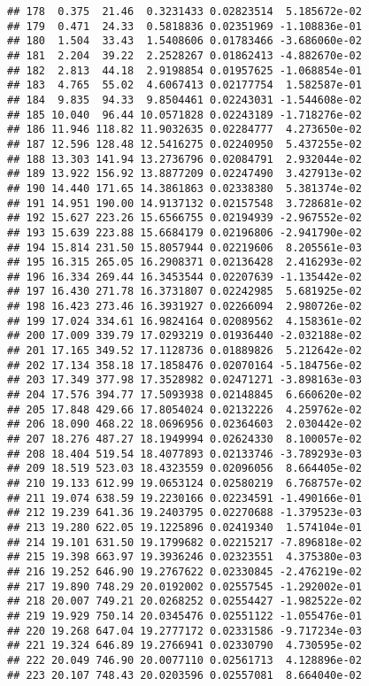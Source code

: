 \documentclass[]{book}
\theoremstyle{definition}
\theoremstyle{definition}
\theoremstyle{definition}
\theoremstyle{remark}
\begin{document}
\begin{verbatim}
## 178  0.375  21.46  0.3231433 0.02823514  5.185672e-02
## 179  0.471  24.33  0.5818836 0.02351969 -1.108836e-01
## 180  1.504  33.43  1.5408606 0.01783466 -3.686060e-02
## 181  2.204  39.22  2.2528267 0.01862413 -4.882670e-02
## 182  2.813  44.18  2.9198854 0.01957625 -1.068854e-01
## 183  4.765  55.02  4.6067413 0.02177754  1.582587e-01
## 184  9.835  94.33  9.8504461 0.02243031 -1.544608e-02
## 185 10.040  96.44 10.0571828 0.02243189 -1.718276e-02
## 186 11.946 118.82 11.9032635 0.02284777  4.273650e-02
## 187 12.596 128.48 12.5416275 0.02240950  5.437255e-02
## 188 13.303 141.94 13.2736796 0.02084791  2.932044e-02
## 189 13.922 156.92 13.8877209 0.02247490  3.427913e-02
## 190 14.440 171.65 14.3861863 0.02338380  5.381374e-02
## 191 14.951 190.00 14.9137132 0.02157548  3.728681e-02
## 192 15.627 223.26 15.6566755 0.02194939 -2.967552e-02
## 193 15.639 223.88 15.6684179 0.02196806 -2.941790e-02
## 194 15.814 231.50 15.8057944 0.02219606  8.205561e-03
## 195 16.315 265.05 16.2908371 0.02136428  2.416293e-02
## 196 16.334 269.44 16.3453544 0.02207639 -1.135442e-02
## 197 16.430 271.78 16.3731807 0.02242985  5.681925e-02
## 198 16.423 273.46 16.3931927 0.02266094  2.980726e-02
## 199 17.024 334.61 16.9824164 0.02089562  4.158361e-02
## 200 17.009 339.79 17.0293219 0.01936440 -2.032188e-02
## 201 17.165 349.52 17.1128736 0.01889826  5.212642e-02
## 202 17.134 358.18 17.1858476 0.02070164 -5.184756e-02
## 203 17.349 377.98 17.3528982 0.02471271 -3.898163e-03
## 204 17.576 394.77 17.5093938 0.02148845  6.660620e-02
## 205 17.848 429.66 17.8054024 0.02132226  4.259762e-02
## 206 18.090 468.22 18.0696956 0.02364603  2.030442e-02
## 207 18.276 487.27 18.1949994 0.02624330  8.100057e-02
## 208 18.404 519.54 18.4077893 0.02133746 -3.789293e-03
## 209 18.519 523.03 18.4323559 0.02096056  8.664405e-02
## 210 19.133 612.99 19.0653124 0.02580219  6.768757e-02
## 211 19.074 638.59 19.2230166 0.02234591 -1.490166e-01
## 212 19.239 641.36 19.2403795 0.02270688 -1.379523e-03
## 213 19.280 622.05 19.1225896 0.02419340  1.574104e-01
## 214 19.101 631.50 19.1799682 0.02215217 -7.896818e-02
## 215 19.398 663.97 19.3936246 0.02323551  4.375380e-03
## 216 19.252 646.90 19.2767622 0.02330845 -2.476219e-02
## 217 19.890 748.29 20.0192002 0.02557545 -1.292002e-01
## 218 20.007 749.21 20.0268252 0.02554427 -1.982522e-02
## 219 19.929 750.14 20.0345476 0.02551122 -1.055476e-01
## 220 19.268 647.04 19.2777172 0.02331586 -9.717234e-03
## 221 19.324 646.89 19.2766941 0.02330790  4.730595e-02
## 222 20.049 746.90 20.0077110 0.02561713  4.128896e-02
## 223 20.107 748.43 20.0203596 0.02557081  8.664040e-02

\end{verbatim}
\end{document}

